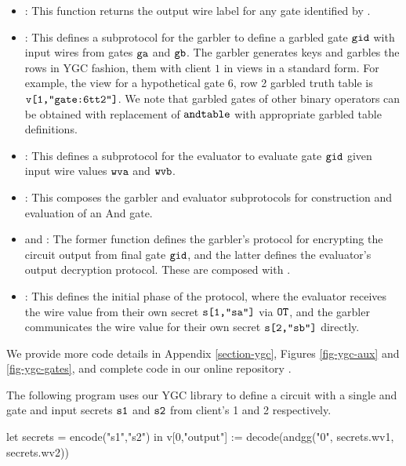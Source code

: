 \begin{itemize}
\item {}: This function returns the output wire label for any
  gate identified by .
\item {}: This defines a subprotocol for the garbler
  to define a garbled gate $\texttt{gid}$ with input wires from gates
  $\texttt{ga}$ and $\texttt{gb}$. The garbler generates keys and garbles
  the rows in YGC fashion, them with client $1$ in
  views in a standard form. For example, the view for
  a hypothetical gate 6, row 2 garbled truth table is $\texttt{v[1,"gate:6tt2"]}$.
  We note that garbled gates of other binary operators can be obtained with
  replacement of $\texttt{andtable}$ with appropriate garbled table definitions. 
\item {}: This defines a subprotocol for the evaluator to
  evaluate gate $\texttt{gid}$ given input wire values $\texttt{wva}$ and
  $\texttt{wvb}$.
\item {}: This composes the garbler and evaluator subprotocols
  for construction and evaluation of an And gate. 
\item {} and : The former function
  defines the garbler's protocol for encrypting the circuit
  output from final gate $\texttt{gid}$, and the latter defines
  the evaluator's output decryption protocol. These are composed with .
\item {}: This defines the initial phase of the protocol,
  where the evaluator receives the wire value from their own
  secret $\texttt{s[1,"sa"]}$ via $\texttt{OT}$, and the garbler communicates
  the wire value for their own secret $\texttt{s[2,"sb"]}$ directly.
\end{itemize}
We provide more code details in Appendix \ref{section-ygc}, Figures
\ref{fig-ygc-aux} and \ref{fig-ygc-gates}, and complete code in our
online repository \cite{jpdf-github}.
\begin{example}
  \label{example-ygc-andcircuit}
The following program uses our YGC library to define
a circuit with a single and gate and input secrets $\texttt{s1}$ and
$\texttt{s2}$ from client's 1 and 2 respectively. 
{\small
\begin{verbatimtab}
  let secrets = encode("s1","s2") in
  v[0,"output"] := decode(andgg("0", secrets.wv1, secrets.wv2)) \end{verbatimtab}
}
\end{example}
